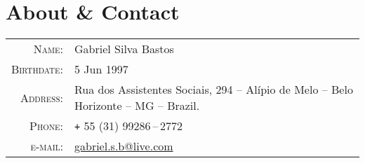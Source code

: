 \documentclass[a4paper,10pt]{article}
\renewcommand\#{\protect\scalebox{0.8}{\protect\raisebox{0.4ex}{\char"0023}}}
\begin{document}
\pagestyle{empty} %

\par{
  \bigskip
  \par
}

\section{About {\normalfont\&} Contact}

\begin{tabular}{rl}
  \textsc{Name:}      & Gabriel Silva Bastos \\
  \textsc{Birthdate:} & 5 Jun 1997 \\
  \textsc{Address:}   & Rua dos Assistentes Sociais, 294 -- Alípio de Melo -- Belo Horizonte -- MG -- Brazil. \\
  \textsc{Phone:}     & \texttt{+} 55 (31) 99286\,--\,2772 \\
  \textsc{e-mail:}    & \href{mailto:gabriel.s.b@live.com}{gabriel.s.b@live.com}
\end{tabular}
\end{document}
